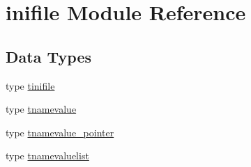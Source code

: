 \hypertarget{namespaceinifile}{}\section{inifile Module Reference}
\label{namespaceinifile}
\subsection*{Data Types}
\begin{DoxyCompactItemize}
\item 
type \mbox{\hyperlink{structinifile_1_1tinifile}{tinifile}}
\item 
type \mbox{\hyperlink{structinifile_1_1tnamevalue}{tnamevalue}}
\item 
type \mbox{\hyperlink{structinifile_1_1tnamevalue__pointer}{tnamevalue\+\_\+pointer}}
\item 
type \mbox{\hyperlink{structinifile_1_1tnamevaluelist}{tnamevaluelist}}
\end{DoxyCompactItemize}
